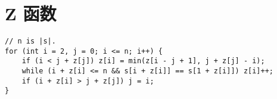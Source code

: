 \section{Z 函数}

\begin{verbatim}
// n is |s|.
for (int i = 2, j = 0; i <= n; i++) {
    if (i < j + z[j]) z[i] = min(z[i - j + 1], j + z[j] - i);
    while (i + z[i] <= n && s[i + z[i]] == s[1 + z[i]]) z[i]++;
    if (i + z[i] > j + z[j]) j = i;
}
\end{verbatim}